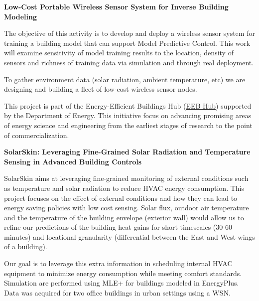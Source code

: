\documentclass[10pt]{article}
\newenvironment{innerlist}[1][\enskip\textbullet]%
        {\begin{compactitem}[#1]}{\end{compactitem}}
\begin{document}
%
\textbf{Low-Cost Portable Wireless Sensor System for Inverse Building Modeling }
\begin{innerlist}
\item The objective of this activity is to develop and deploy a wireless sensor system for training a building model that can support Model Predictive Control. This work will examine sensitivity of model training results to the location, density of sensors and richness of training data via simulation and through real deployment. 
\item To gather environment data (solar radiation, ambient temperature, etc) we are designing and building a fleet of low-cost wireless sensor nodes. 
\item This project is part of the Energy-Efficient Buildings Hub (\href{http://www.eebhub.org}{EEB Hub}) supported by the Department of Energy. This initiative focus on advancing promising areas of energy science and engineering from the earliest stages of research to the point of commercialization.\\ 
\end{innerlist}

\textbf{SolarSkin: Leveraging Fine-Grained Solar Radiation and Temperature Sensing in Advanced Building Controls}
\begin{innerlist}
\item SolarSkin aims at leveraging fine-grained monitoring of external conditions such as temperature and solar radiation to reduce HVAC energy consumption. This project focuses on the effect of external conditions and how they can lead to energy saving policies with low cost sensing. Solar flux, outdoor air temperature and the temperature of the building envelope (exterior wall) would allow us to refine our predictions of the building heat gains for short timescales (30-60 minutes) and locational granularity (differential between the East and West wings of a building). 
\item Our goal is to leverage this extra information in scheduling internal HVAC equipment to minimize energy consumption while meeting comfort standards. Simulation are performed using MLE+ for buildings modeled in EnergyPlus. Data was acquired for two office buildings in urban settings using a WSN.\\ 
\end{innerlist}
\end{document}
